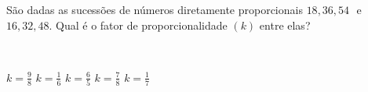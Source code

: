 \parbox{\linewidth}{

São dadas as sucessões de números diretamente proporcionais $18, 36, 54$\, \,e\, \,$16, 32,48$. Qual é o fator de proporcionalidade $(k)$ entre elas?}\vspace{2mm}\\\parbox{\linewidth}{

$k=\frac{9}{8}$
$k=\frac{1}{6}$
$k=\frac{6}{5}$
$k=\frac{7}{8}$
$k=\frac{1}{7}$

}

